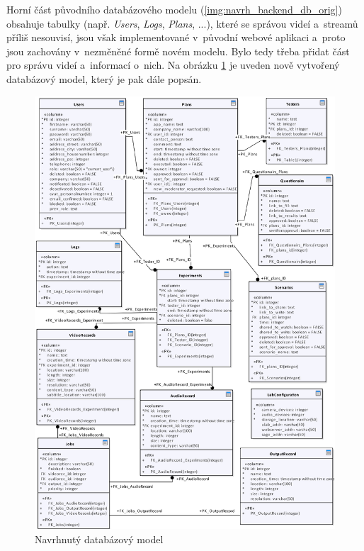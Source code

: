 \documentclass[thesis=M,czech]{FITthesis}[2012/06/26]
\begin{document}
Horní část původního databázového modelu (\ref{img:navrh_backend_db_orig}) obsahuje tabulky (např. \textit{Users}, \textit{Logs}, \textit{Plans}, ...), které se správou videí a~streamů příliš nesouvisí, jsou však implementované v~původní webové aplikaci a~proto jsou zachovány v~nezměněné formě novém modelu. Bylo tedy třeba přidat část pro správu videí a~informací o~nich. Na obrázku \ref{img:navrh_backend_db} je uveden nově vytvořený databázový model, který je pak dále popsán.
\\
\begin{figure}[h]\centering
	\includegraphics[width=1\textwidth]{images/db.eps}
	\caption{Navrhnutý databázový model}\label{img:navrh_backend_db}
\end{figure}
\end{document}
